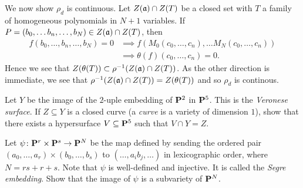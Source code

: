 \documentclass[10pt]{amsart}
\begin{document}
\begin{solution}
\begin{luke}
\begin{enumerate}
        We now show $\rho_d$ is continuous. Let $Z(\mathfrak{a}) \cap Z(T)$ be a closed set 
        with $T$ a family of homogeneous polynomials in $N+1$ variables. If $P = 
        (b_0, \dots b_n, \dots, b_N) \in Z(\mathfrak{a}) \cap Z(T)$, then 
        \begin{align*}
            f(b_0, \dots, b_n, \dots, b_N) = 0
            &\implies 
            f(M_0(c_0, \dots, c_n), \dots M_N(c_0, \dots, c_n))\\
            &\implies 
            \theta(f)(c_0, \dots, c_n) = 0.
        \end{align*} 
        Hence we see that $Z(\theta(T)) \subset \rho^{-1}(Z(\mathfrak{a}) \cap Z(T))$. 
        As the other direction is immediate, we see that $\rho^{-1}(Z(\mathfrak{a}) \cap Z(T)) = Z(\theta(T))$ 
        and so $\rho_d$ is continous.

            
        \end{enumerate}
    \end{luke}
\end{solution}

\begin{exercise}[2.13]
    Let $Y$ be the image of the $2$-uple embedding of ${\bf P}^2$ in ${\bf P}^5$. This is the
    \emph{Veronese surface}. If $Z \subseteq Y$ is a closed curve (a \emph{curve} is 
    a variety of dimension $1$), show that there exists a hypersurface $V \subseteq
    {\bf P}^5$ such that $V \cap Y = Z$. 
\end{exercise}

\begin{solution}
    
\end{solution}

\begin{exercise}[2.14]
    Let $\psi\colon {\bf P}^r \times {\bf P}^s \to {\bf P}^N$ be the map defined by sending
    the ordered pair $(a_0, \ldots, a_r) \times (b_0, \ldots, b_s)$ to $(\ldots,
    a_ib_j, \ldots)$ in lexicographic order, where $N = rs + r +s$. Note that
    $\psi$ is well-defined and injective. It is called the \emph{Segre embedding}.
    Show that the image of $\psi$ is a subvariety of ${\bf P}^N$.
\end{exercise}

\begin{solution}
    
\end{solution}
\end{document}
